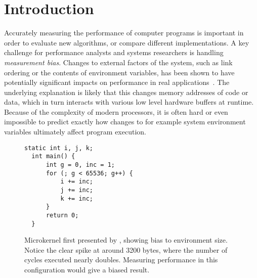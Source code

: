 \documentclass{acm_proc_article-sp}
\begin{document}
\section{Introduction}
Accurately measuring the performance of computer programs is important in order to evaluate new algorithms, or compare different implementations.
A key challenge for performance analysts and systems researchers is handling \emph{measurement bias}.
Changes to external factors of the system, such as link ordering or the contents of environment variables, has been shown to have potentially significant impacts on performance in real applications~\cite{Mytkowicz:2009:WrongData}.
The underlying explanation is likely that this changes memory addresses of code or data, which in turn interacts with various low level hardware buffers at runtime.
Because of the complexity of modern processors, it is often hard or even impossible to predict exactly how changes to for example system environment variables ultimately affect program execution.

\begin{figure}[t]
\begin{minipage}[t]{0.40\textwidth}
  \vspace{3mm}
  \begin{lstlisting}[frame=tb]
  static int i, j, k;
  int main() {
      int g = 0, inc = 1;
      for (; g < 65536; g++) {
          i += inc;
          j += inc;
          k += inc;
      }
      return 0;
  }
  \end{lstlisting}
\end{minipage}
\begin{minipage}[t]{0.55\textwidth}
  \begin{flushleft}
  \end{flushleft}
\end{minipage}
\label{fig:motivation}
\caption{Microkernel first presented by , showing bias to environment size. Notice the clear spike at around 3200 bytes, where the number of cycles executed nearly doubles. Measuring performance in this configuration would give a biased result.}
\end{figure}
\end{document}

